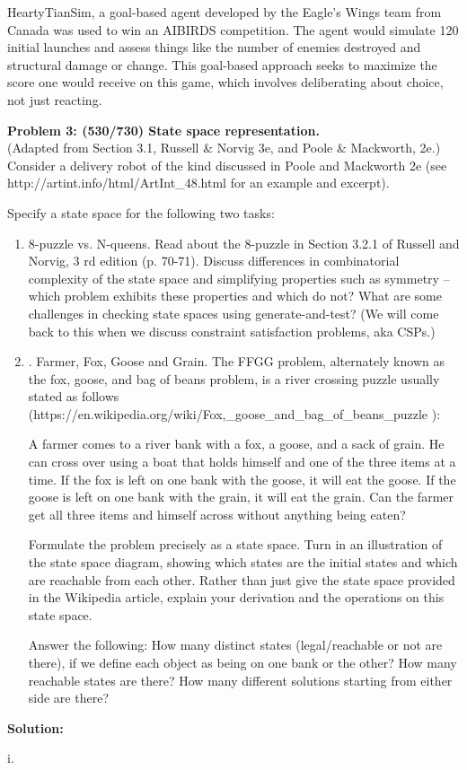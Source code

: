 \documentclass{amsart}
\theoremstyle{definition}
\begin{document}
HeartyTianSim, a goal-based agent developed by the Eagle's Wings team from Canada was used to win an AIBIRDS competition.
The agent would simulate 120 initial launches and assess things like the number of enemies destroyed and structural damage or change.
This goal-based approach seeks to maximize the score one would receive on this game, which involves deliberating about choice, not just reacting.



\newpage
\textbf{Problem 3: (530/730) State space representation.} \\
(Adapted from Section 3.1, Russell \& Norvig 3e, and Poole \& Mackworth, 2e.) Consider a delivery robot of the kind discussed in Poole and
Mackworth 2e (see http://artint.info/html/ArtInt\_48.html for an example and excerpt).

Specify a state space for the following two tasks:
\begin{enumerate}
\item 8-puzzle vs. N-queens. Read about the 8-puzzle in Section 3.2.1 of Russell and Norvig, 3 rd edition (p. 70-71).
Discuss differences in combinatorial complexity of the state space and simplifying properties such as symmetry – which problem
exhibits these properties and which do not?
What are some challenges in checking state spaces using generate-and-test?
(We will come back to this when we discuss constraint satisfaction problems, aka CSPs.)

\item. Farmer, Fox, Goose and Grain.
The FFGG problem, alternately known as the fox, goose, and bag of beans problem, is a river crossing puzzle usually stated as follows (https://en.wikipedia.org/wiki/Fox,\_goose\_and\_bag\_of\_beans\_puzzle ):

A farmer comes to a river bank with a fox, a goose, and a sack of grain.
He can cross over using a boat that holds himself and one of the three items at a time.
If the fox is left on one bank with the goose, it will eat the goose.
If the goose is left on one bank with the grain, it will eat the grain.
Can the farmer get all three items and himself across without anything being eaten?

Formulate the problem precisely as a state space.
Turn in an illustration of the state space diagram, showing which states are the initial states and which are reachable from each other.
Rather than just give the state space provided in the Wikipedia article, explain your derivation and the operations on this state space.

Answer the following: How many distinct states (legal/reachable or not are there), if we define each object as being on one bank or the other?
How many reachable states are there? How many different solutions starting from either side are there?
\end{enumerate}

\bigbreak

\textbf{Solution:}

i. 


\newpage
\end{document}

